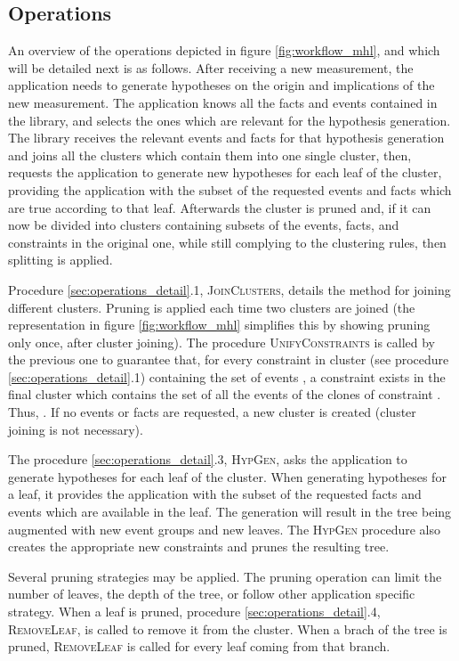 \subsection{Operations}
An overview of the operations depicted in figure \ref{fig:workflow_mhl}, and which will be detailed next is as follows. After receiving a new measurement, the application needs to generate hypotheses on the origin and implications of the new measurement. The application knows all the facts and events contained in the library, and selects the ones which are relevant for the hypothesis generation. The library receives the relevant events and facts for that hypothesis generation and joins all the clusters which contain them into one single cluster, then, requests the application to generate new hypotheses for each leaf of the cluster, providing the application with the subset of the requested events and facts which are true according to that leaf. Afterwards the cluster is pruned and, if it can now be divided into clusters containing subsets of the events, facts, and constraints in the original one, while still complying to the clustering rules, then splitting is applied.

Procedure \ref{sec:operations_detail}.1, \textsc{JoinClusters}, details the method for joining different clusters. Pruning is applied each time two clusters are joined (the representation in figure \ref{fig:workflow_mhl} simplifies this by showing pruning only once, after cluster joining).
The procedure \textsc{UnifyConstraints} is called by the previous one to guarantee that, for every constraint  in cluster  (see procedure \ref{sec:operations_detail}.1) containing the set of events , a constraint  exists in the final cluster which contains the set  of all the events of the clones of constraint . Thus, . If no events or facts are requested, a new cluster is created (cluster joining is not necessary).

The procedure \ref{sec:operations_detail}.3, \textsc{HypGen}, asks the application to generate hypotheses for each leaf of the cluster. When generating hypotheses for a leaf, it provides the application with the subset of the requested facts and events which are available in the leaf. The generation will result in the tree being augmented with new event groups and new leaves. The \textsc{HypGen} procedure also creates the appropriate new constraints and prunes the resulting tree.

Several pruning strategies may be applied. The pruning operation can limit the number of leaves, the depth of the tree, or follow other application specific strategy. When a leaf is pruned, procedure \ref{sec:operations_detail}.4, \textsc{RemoveLeaf}, is called to remove it from the cluster. When a brach of the tree is pruned, \textsc{RemoveLeaf} is called for every leaf coming from that branch.

